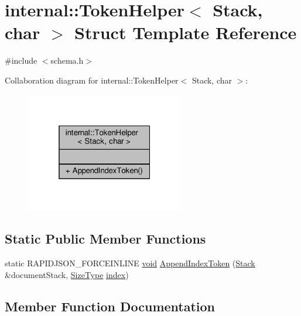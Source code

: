 \hypertarget{structinternal_1_1TokenHelper_3_01Stack_00_01char_01_4}{}\section{internal\+:\+:Token\+Helper$<$ Stack, char $>$ Struct Template Reference}
\label{structinternal_1_1TokenHelper_3_01Stack_00_01char_01_4}


{\ttfamily \#include $<$schema.\+h$>$}



Collaboration diagram for internal\+:\+:Token\+Helper$<$ Stack, char $>$\+:
\nopagebreak
\begin{figure}[H]
\begin{center}
\leavevmode
\includegraphics[width=196pt]{structinternal_1_1TokenHelper_3_01Stack_00_01char_01_4__coll__graph}
\end{center}
\end{figure}
\subsection*{Static Public Member Functions}
\begin{DoxyCompactItemize}
\item 
static R\+A\+P\+I\+D\+J\+S\+O\+N\+\_\+\+F\+O\+R\+C\+E\+I\+N\+L\+I\+NE \hyperlink{imgui__impl__opengl3__loader_8h_ac668e7cffd9e2e9cfee428b9b2f34fa7}{void} \hyperlink{structinternal_1_1TokenHelper_3_01Stack_00_01char_01_4_a5d635eb7590e098c3340c9e5dcc72ae3}{Append\+Index\+Token} (\hyperlink{classinternal_1_1Stack}{Stack} \&document\+Stack, \hyperlink{rapidjson_8h_a5ed6e6e67250fadbd041127e6386dcb5}{Size\+Type} \hyperlink{imgui__impl__opengl3__loader_8h_a57f14e05b1900f16a2da82ade47d0c6d}{index})
\end{DoxyCompactItemize}


\subsection{Member Function Documentation}
\mbox{\label{structinternal_1_1TokenHelper_3_01Stack_00_01char_01_4_a5d635eb7590e098c3340c9e5dcc72ae3}} 
